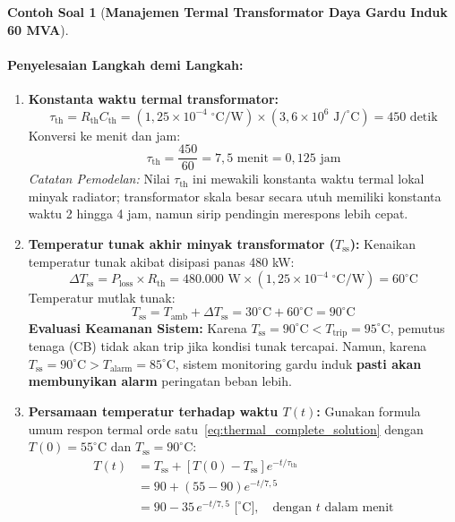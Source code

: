\documentclass[11pt,a4paper]{article}
\theoremstyle{definition}
\newtheorem{example}{Contoh Soal}[section]
\begin{document}
\begin{example}[\textbf{Manajemen Termal Transformator Daya Gardu Induk 60 MVA}]
\paragraph{Penyelesaian Langkah demi Langkah:}
\begin{enumerate}[label=(\alph*), leftmargin=*]
    \item \textbf{Konstanta waktu termal transformator:}
    \begin{equation*}
        \tau_{\text{th}} = R_{\text{th}} C_{\text{th}} = (1{,}25 \times 10^{-4}\;^\circ\text{C}/\text{W}) \times (3{,}6 \times 10^6\text{ J}/^\circ\text{C}) = 450\text{ detik}
    \end{equation*}
    Konversi ke menit dan jam:
    \begin{equation*}
        \tau_{\text{th}} = \frac{450}{60} = 7{,}5\text{ menit} = 0{,}125\text{ jam}
    \end{equation*}
    \textit{Catatan Pemodelan:} Nilai $\tau_{\text{th}}$ ini mewakili konstanta waktu termal lokal minyak radiator; transformator skala besar secara utuh memiliki konstanta waktu 2 hingga 4 jam, namun sirip pendingin merespons lebih cepat.

    \item \textbf{Temperatur tunak akhir minyak transformator ($T_{\text{ss}}$):}
    Kenaikan temperatur tunak akibat disipasi panas 480 kW:
    \begin{equation*}
        \Delta T_{\text{ss}} = P_{\text{loss}} \times R_{\text{th}} = 480.000\text{ W} \times (1{,}25 \times 10^{-4}\;^\circ\text{C}/\text{W}) = 60^\circ\text{C}
    \end{equation*}
    Temperatur mutlak tunak:
    \begin{equation*}
        T_{\text{ss}} = T_{\text{amb}} + \Delta T_{\text{ss}} = 30^\circ\text{C} + 60^\circ\text{C} = 90^\circ\text{C}
    \end{equation*}
    \textbf{Evaluasi Keamanan Sistem:}
    Karena $T_{\text{ss}} = 90^\circ\text{C} < T_{\text{trip}} = 95^\circ\text{C}$, pemutus tenaga (CB) tidak akan trip jika kondisi tunak tercapai. Namun, karena $T_{\text{ss}} = 90^\circ\text{C} > T_{\text{alarm}} = 85^\circ\text{C}$, sistem monitoring gardu induk \textbf{pasti akan membunyikan alarm} peringatan beban lebih.

    \item \textbf{Persamaan temperatur terhadap waktu $T(t)$:}
    Gunakan formula umum respon termal orde satu~\eqref{eq:thermal_complete_solution} dengan $T(0) = 55^\circ\text{C}$ dan $T_{\text{ss}} = 90^\circ\text{C}$:
    \begin{align*}
        T(t) &= T_{\text{ss}} + \left[ T(0) - T_{\text{ss}} \right] e^{-t/\tau_{\text{th}}} \\
             &= 90 + (55 - 90) e^{-t/7{,}5} \\
             &= 90 - 35 \, e^{-t/7{,}5}\text{ [}^\circ\text{C]}, \quad \text{dengan } t \text{ dalam menit}
    \end{align*}


\end{enumerate}
\end{example}
\end{document}
